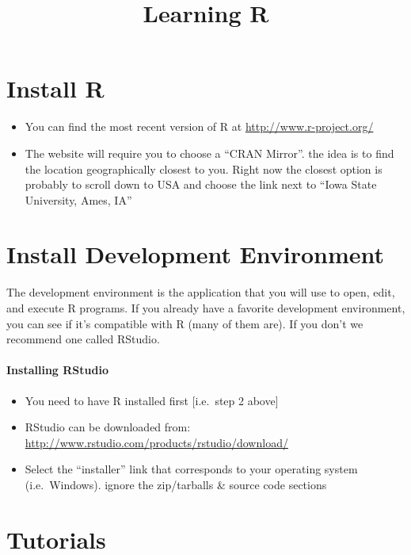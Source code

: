 \documentclass[]{article}
\title{Learning R}
\author{}
\date{}
\begin{document}
\maketitle


\section{Install R}\label{install-r}

\begin{itemize}
\itemsep1pt\parskip0pt
\item
  You can find the most recent version of R at
  \url{http://www.r-project.org/}
\item
  The website will require you to choose a ``CRAN Mirror''. the idea is
  to find the location geographically closest to you. Right now the
  closest option is probably to scroll down to USA and choose the link
  next to ``Iowa State University, Ames, IA''
\end{itemize}

\section{Install Development
Environment}\label{install-development-environment}

The development environment is the application that you will use to
open, edit, and execute R programs. If you already have a favorite
development environment, you can see if it's compatible with R (many of
them are). If you don't we recommend one called RStudio.

\paragraph{Installing RStudio}\label{installing-rstudio}

\begin{itemize}
\itemsep1pt\parskip0pt
\item
  You need to have R installed first {[}i.e.~step 2 above{]}
\item
  RStudio can be downloaded from:
  \url{http://www.rstudio.com/products/rstudio/download/}
\item
  Select the ``installer'' link that corresponds to your operating
  system (i.e.~Windows). ignore the zip/tarballs \& source code sections
\end{itemize}

\section{Tutorials}\label{tutorials}
\end{document}
